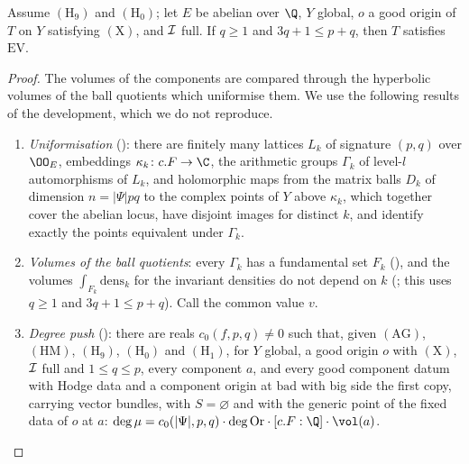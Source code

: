 \begin{proposition}\label{pf:volthm:prop:voleqproof}
Assume $(\mathrm{H}_9)$ and $(\mathrm{H}_0)$; let $E$ be abelian over $\Q$, $Y$ global, $o$ a good origin of $T$ on $Y$
satisfying $(\mathrm{X})$, and $\mathcal{I}$ full. If $q\ge1$ and $3q+1\le p+q$, then $T$ satisfies $\mathrm{EV}$.
\end{proposition}

\begin{proof}
The volumes of the components are compared through the hyperbolic volumes of the ball quotients which uniformise
them. We use the following results of the development, which we do not reproduce.
\begin{enumerate}[label=(\alph*)]
\item \emph{Uniformisation} (): there are finitely many lattices $L_k$ of
signature $(p,q)$ over $\OO_E$, embeddings $\kappa_k\colon c.F\to\C$, the arithmetic groups $\Gamma_k$ of level-$l$
automorphisms of $L_k$, and holomorphic maps from the matrix balls $D_k$ of dimension $n=|\Psi|pq$ to the complex
points of $Y$ above $\kappa_k$, which together cover the abelian locus, have disjoint images for distinct $k$, and
identify exactly the points equivalent under $\Gamma_k$.
\item \emph{Volumes of the ball quotients}: every $\Gamma_k$ has a fundamental set $F_k$
(), and the volumes $\int_{F_k}\mathrm{dens}_k$ for the invariant
densities do not depend on $k$ (; this uses $q\ge1$ and $3q+1\le p+q$). Call
the common value $v$.
\item \emph{Degree push} (): there are reals $c_0(f,p,q)\ne0$ such that, given
$(\mathrm{AG})$, $(\mathrm{HM})$, $(\mathrm{H}_9)$, $(\mathrm{H}_0)$ and $(\mathrm{H}_1)$, for $Y$ global, a good origin $o$
with $(\mathrm{X})$, $\mathcal{I}$ full and $1\le q\le p$, every component $a$, and every good component datum with Hodge data and a component
origin at $\mathrm{bad}$ with big side the first copy, carrying vector bundles, with $S=\varnothing$ and with the
generic point of the fixed data of $o$ at $a$: $\deg\mu=c_0(|\Psi|,p,q)\cdot\deg\mathrm{Or}\cdot[c.F:\Q]\cdot\vol(a)$.

\end{enumerate}
\end{proof}
